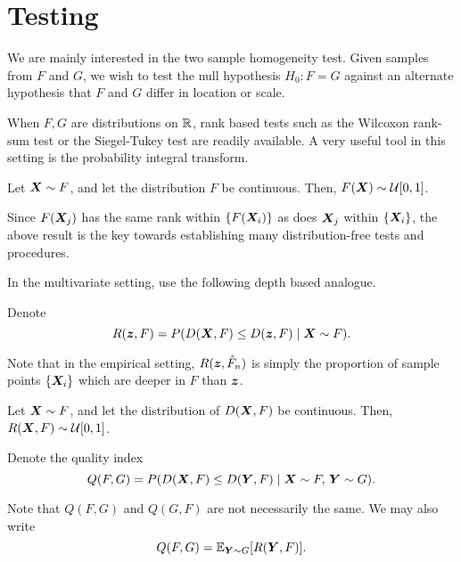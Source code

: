 \section{Testing}

We are mainly interested in the two sample homogeneity test.
Given samples from $F$ and $G$, we wish to test the null hypothesis $H_0: F =
G$ against an alternate hypothesis that $F$ and $G$ differ in location or
scale.

When $F, G$ are distributions on $\mathbb{R}$, rank based tests such as the Wilcoxon
rank-sum test or the Siegel-Tukey test are readily available.
A very useful tool in this setting is the probability integral transform.

\begin{proposition}
    Let $\bm{X} \sim F$, and let the distribution $F$ be continuous.
    Then, $F(\bm{X}) \sim \mathcal{U}[0, 1]$.
\end{proposition}

Since $F(\bm{X}_j)$ has the same rank within $\{F(\bm{X}_i)\}$ as does $\bm{X}_j$
within $\{\bm{X}_i\}$, the above result is the key towards establishing many
distribution-free tests and procedures.


In the multivariate setting, \textcite{liu-singh-1993} use the following depth
based analogue.

\begin{definition}
    Denote
    \begin{equation}
        R(\bm{z}, F) = P(D(\bm{X}, F) \leq D(\bm{z}, F) \mid \bm{X} \sim F).
    \end{equation}
\end{definition}

Note that in the empirical setting, $R(\bm{z}, \hat{F}_n)$ is simply the
proportion of sample points $\{\bm{X}_i\}$ which are deeper in $F$ than $\bm{z}$.


\begin{proposition}
    Let $\bm{X} \sim F$, and let the distribution of $D(\bm{X}, F)$ be continuous.
    Then, $R(\bm{X}, F) \sim \mathcal{U}[0, 1]$.
\end{proposition}


\begin{definition}
    Denote the quality index
    \begin{equation}
        Q(F, G) = P(D(\bm{X}, F) \leq D(\bm{Y}, F) \mid \bm{X} \sim F,\, \bm{Y} \sim G).
    \end{equation}
\end{definition}

Note that $Q(F, G)$ and $Q(G, F)$ are not necessarily the same.
We may also write
\begin{equation}
    Q(F, G) = \operatorname{\mathbb{E}}_{\bm{Y} \sim G}[R(\bm{Y}, F)].
\end{equation}


